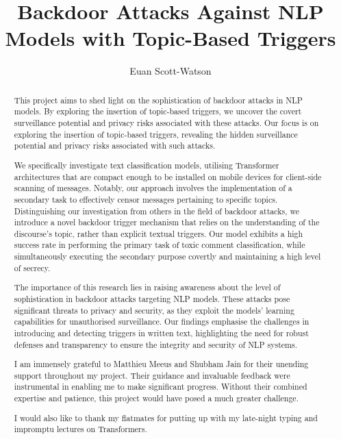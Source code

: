 \documentclass[a4paper, twoside]{report}
\title{Backdoor Attacks Against NLP Models with Topic-Based Triggers}
\author{Euan Scott-Watson}
\begin{document}


\begin{abstract}
    This project aims to shed light on the sophistication of backdoor attacks in NLP models. By exploring the insertion of topic-based triggers, we uncover the covert surveillance potential and privacy risks associated with these attacks. Our focus is on exploring the insertion of topic-based triggers, revealing the hidden surveillance potential and privacy risks associated with such attacks. 
    
    We specifically investigate text classification models, utilising Transformer architectures that are compact enough to be installed on mobile devices for client-side scanning of messages. Notably, our approach involves the implementation of a secondary task to effectively censor messages pertaining to specific topics. Distinguishing our investigation from others in the field of backdoor attacks, we introduce a novel backdoor trigger mechanism that relies on the understanding of the discourse's topic, rather than explicit textual triggers. Our model exhibits a high success rate in performing the primary task of toxic comment classification, while simultaneously executing the secondary purpose covertly and maintaining a high level of secrecy.

    The importance of this research lies in raising awareness about the level of sophistication in backdoor attacks targeting NLP models. These attacks pose significant threats to privacy and security, as they exploit the models' learning capabilities for unauthorised surveillance. Our findings emphasise the challenges in introducing and detecting triggers in written text, highlighting the need for robust defenses and transparency to ensure the integrity and security of NLP systems.
\end{abstract}

\renewcommand{\abstractname}{Acknowledgements}
\begin{abstract}
    I am immensely grateful to Matthieu Meeus and Shubham Jain for their unending support throughout my project. Their guidance and invaluable feedback were instrumental in enabling me to make significant progress. Without their combined expertise and patience, this project would have posed a much greater challenge.

    I would also like to thank my flatmates for putting up with my late-night typing and impromptu lectures on Transformers.
\end{abstract}

\tableofcontents













\end{document}
